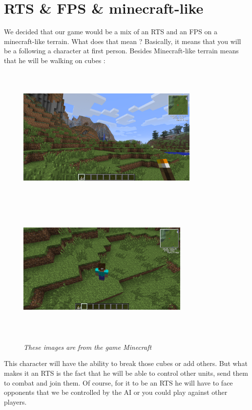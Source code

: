 \documentclass[article]{report} %
\begin{document}
						\section{RTS \& FPS \& minecraft-like}
								We decided that our game would be a mix of an \ac{RTS} and an \ac{FPS} on a minecraft-like terrain. What does that mean ? Basically, it means that you will be a following a character at first person. Besides Minecraft-like terrain means that he will be walking on cubes :\\ 
							\begin{figure}[h]
								\includegraphics[width=9cm,   height=7cm]{Images/Terrain.png}
								\includegraphics[width=8.5cm, height=7cm]{Images/Terrain2.png}
								\begin{center}\it These images are from the game Minecraft\end{center}
							\end{figure}
								
								This character will have the ability to break those cubes or add others. But what makes it an \ac{RTS} is the fact that he will be able to control other units, send them to combat and join them. Of course, for it to be an \ac{RTS} he will have to face opponents that we be controlled by the AI or you could play against other players.\\
								
\end{document}
